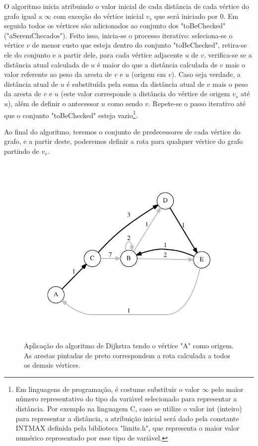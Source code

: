 O algoritmo inicia atribuindo o valor inicial de cada distância de cada vértice do grafo igual a $\infty$ com exceção do vértice inicial $v_{s}$ que será iniciado por 0. Em seguida todos os vértices são adicionados ao conjunto dos "toBeChecked" ("aSeremChecados"). Feito isso, inicia-se o processo iterativo: seleciona-se o vértice $v$ de menor custo que esteja dentro do conjunto "toBeChecked", retira-se ele do conjunto e a partir dele, para cada vértice adjacente $u$ de $v$, verifica-se se a distância atual calculada de $u$ é maior do que a distância calculada de $v$ mais o valor referente ao peso da aresta de $v$ e $u$ (origem em $v$). Caso seja verdade, a distância atual de $u$ é substituída pela soma da distância atual de $v$ mais o peso da aresta de $v$ e $u$ (este valor corresponde a distância do vértice de origem $v_{s}$ até $u$), além de definir o antecessor $u$ como sendo $v$. Repete-se o passo iterativo até que o conjunto "toBeChecked" esteja vazio\footnote{Em linguagens de programação, é costume substituir o valor $\infty$ pelo maior número representativo do tipo da variável selecionado para representar a distância. Por exemplo na linguagem C, caso se utilize o valor int (inteiro) para representar a distância, a atribuição inicial será dado pela constante INT\underline{\space}MAX  definida pela biblioteca "limits.h", que representa o maior valor numérico representado por esse tipo de variável.}.

Ao final do algoritmo, teremos o conjunto de predecessores de cada vértice do grafo, e a partir deste, poderemos definir a rota para qualquer vértice do grafo partindo de $v_{s}$.

\begin{figure}[H]
\centering
\includegraphics[width=1.\textwidth]{figuras/grafo-dijkstra} 
\caption{Aplicação do algoritmo de Dijkstra tendo o vértice "A" como origem. As arestas pintadas de preto correspondem a rota calculada a todos os demais vértices.}
\label{fig-dijkstra-algoritmo-grafo}
\end{figure}


